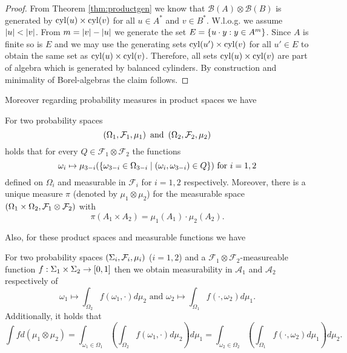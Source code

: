 \begin{proof}
  From Theorem \ref{thm:productgen} we know that
  $\mathcal{B}(A)\otimes\mathcal{B}(B)$ is generated by $\operatorname{cyl}(u)\times\operatorname{cyl}(v)$
  for all $u\in A^{*}$ and $v\in B^{*}$.
  W.l.o.g. we assume $\left\vert{u}\right\vert < \left\vert{v}\right\vert$. From $m = \left\vert{v}\right\vert - \left\vert{u}\right\vert$ we
  generate the set $E = \left\{u\cdot y:y\in A^{m}\right\}$. Since $A$ is finite so is
  $E$ and we may use the generating sets $\operatorname{cyl}(u')\times\operatorname{cyl}(v)$ for all
  $u'\in E$ to obtain the same set as $\operatorname{cyl}(u)\times\operatorname{cyl}(v)$. Therefore, all
  sets $\operatorname{cyl}(u)\times\operatorname{cyl}(v)$ are part of algebra which is generated by
  balanced cylinders. By construction and minimality of Borel-algebras the
  claim follows.
\end{proof}

Moreover regarding probability measures in product spaces we have
\begin{lemma}
  \cite[Lemma 23.2, Theorem 23.3]{Bauer}
  For two probability spaces 
  \begin{equation*}
    \left(\Omega_{1}, \mathcal{F}_{1}, \mu_{1}\right)\text{ and }
    \left(\Omega_{2}, \mathcal{F}_{2}, \mu_{2}\right)
  \end{equation*}
  holds that for every $Q\in\mathcal{F}_{1}\otimes\mathcal{F}_{2}$ the 
  functions
  \begin{equation*}
    \omega_{i}\mapsto\mu_{3-i}(\left\{\omega_{3-i}\in\Omega_{3-i}\mid
      \left(\omega_{i}, \omega_{3-i}\right)\in Q\right\})
    \text{ for }i = 1,2
  \end{equation*}
  defined on $\Omega_{i}$ and measurable in $\mathcal{F}_{i}$ for $i = 1,2$
  respectively. Moreover, there is a unique measure $\pi$ (denoted by 
  $\mu_{1}\otimes\mu_{2}$) for the measurable space 
  $\left(\Omega_{1}\times\Omega_{2}, \mathcal{F}_{1}\otimes\mathcal{F}_{2}\right)$ 
  with 
  \begin{equation*}
    \pi(A_{1}\times A_{2}) = \mu_{1}(A_{1})\cdot\mu_{2}(A_{2}).
  \end{equation*}
  \label{lem:productmeasure}
\end{lemma} 
Also, for these product spaces and measurable functions we have
\begin{theorem}
  \cite[Theorem 23.6]{Bauer}
  For two probability spaces $\left(\Sigma_{i}, \mathcal{F}_{i}, \mu_{i}\right)$ 
  ($i = 1,2$) and a $\mathcal{F}_{1}\otimes\mathcal{F}_{2}$-measureable 
  function $f:\Sigma_{1}\times\Sigma_{2}\rightarrow\left[0,1\right]$ then
  we obtain measurability in $\mathcal{A}_{1}$ and $\mathcal{A}_{2}$ 
  respectively of
  \begin{equation*}
    \omega_{1}\mapsto\int_{\Omega_{2}} f(\omega_{1},\cdot)d\mu_{2}
    \text{ and }
    \omega_{2}\mapsto\int_{\Omega_{1}} f(\cdot,\omega_{2})d\mu_{1}.
  \end{equation*}
  Additionally, it holds that
  \begin{equation*}
    \int f d(\mu_{1}\otimes\mu_{2}) 
    = \int_{\omega_{1}\in\Omega_{1}}(\int_{\Omega_{2}} f(\omega_{1},\cdot)
      d\mu_{2})d\mu_{1}
    = \int_{\omega_{2}\in\Omega_{2}}(\int_{\Omega_{1}} f(\cdot,\omega_{2})
      d\mu_{1})d\mu_{2}.
  \end{equation*}
  \label{thm:tonelli}
\end{theorem}

